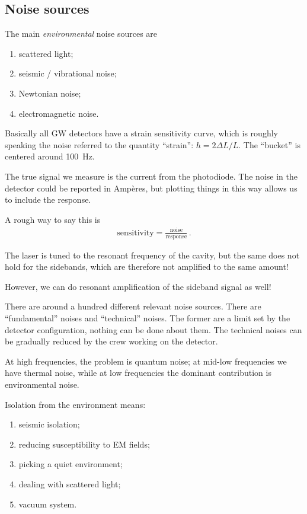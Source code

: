 \documentclass[main.tex]{subfiles}
\begin{document}
\subsection{Noise sources}

The main \emph{environmental} noise sources are
\begin{enumerate}
    \item scattered light;
    \item seismic / vibrational noise;
    \item Newtonian noise;
    \item electromagnetic noise.
\end{enumerate}

Basically all GW detectors have a strain sensitivity curve, which is roughly 
speaking the noise referred to the quantity ``strain'': \(h = 2 \Delta L / L\). 
The ``bucket'' is centered around \SI{100}{Hz}.

The true signal we measure is the current from the photodiode. 
The noise in the detector could be reported in Ampères, but plotting 
things in this way allows us to include the response. 

A rough way to say this is 
%
\begin{align}
\text{sensitivity} = \frac{\text{noise}}{\text{response}}
\,.
\end{align}

The laser is tuned to the resonant frequency of the cavity, 
but the same does not hold for the sidebands, which are therefore not 
amplified to the same amount!

However, we can do resonant amplification of the sideband signal as well! 

There are around a hundred different relevant noise sources. 
There are ``fundamental'' noises and ``technical'' noises.
The former are a limit set by the detector configuration, nothing can be done about them. 
The technical noises can be gradually reduced by the crew working on the detector.

At high frequencies, the problem is quantum noise; 
at mid-low frequencies we have thermal noise, 
while at low frequencies the dominant contribution is environmental noise. 

Isolation from the environment means: 
\begin{enumerate}
    \item seismic isolation;
    \item reducing susceptibility to EM fields;
    \item picking a quiet environment;
    \item dealing with scattered light;
    \item vacuum system.
\end{enumerate}
\end{document}
